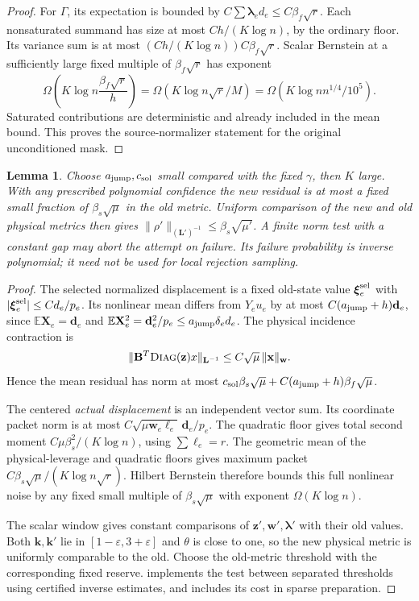 \documentclass[11pt]{article}
\newtheorem{lemma}[theorem]{Lemma}
\theoremstyle{remark}
\newcommand{\BB}{\mathbf B}
\newcommand{\LL}{\mathbf L}
\newcommand{\llambda}{\boldsymbol{\lambda}}
\newcommand{\ww}{\mathbf w}
\newcommand{\zz}{\mathbf z}
\newcommand{\XX}{\mathbf X}
\newcommand{\kk}{\mathbf k}
\newcommand{\dd}{\mathbf d}
\newcommand{\xx}{\mathbf x}
\newcommand{\xxi}{\boldsymbol{\xi}}
\newcommand{\diag}{\textsc{Diag}}
\newcommand{\Ex}{\mathbb E}
\newcommand{\norm}[1]{\lVert#1\rVert}
\begin{document}
\begin{proof}
For $\Gamma$, its expectation is bounded by $C\sum\llambda_ed_e\le C\beta_f\sqrt
r$.
Each nonsaturated summand has size at most $Ch/(K\log n)$, by the ordinary floor.
Its variance sum is at most $(Ch/(K\log n))C\beta_f\sqrt r$.
Scalar Bernstein at a sufficiently large fixed multiple of $\beta_f\sqrt r$ has
exponent
\[
 \Omega\left(K\log n\frac{\beta_f\sqrt r}{h}\right)
 =\Omega(K\log n\sqrt r/M)=\Omega(K\log n n^{1/4}/10^5).
\]
Saturated contributions are deterministic and already included in the mean
bound.
This proves the source-normalizer statement for the original unconditioned mask.
\end{proof}

\begin{lemma}
\label{lem:ram-residual}
Choose $a_{\rm jump},c_{\rm sol}$ small compared with the fixed $\gamma$, then
$K$ large.
With any prescribed polynomial confidence the new residual is at most a fixed
small fraction of $\beta_s\sqrt\mu$ in the old metric.
Uniform comparison of the new and old physical metrics then gives
$\norm{\rho'}_{(\LL')^{-1}}\le\beta_s\sqrt{\mu'}$.
A finite norm test with a constant gap may abort the attempt on failure.
Its failure probability is inverse polynomial; it need not be used for local
rejection sampling.
\end{lemma} \begin{proof} The selected normalized displacement is a fixed
old-state value $\xxi_e^{\rm sel}$ with $|\xxi_e^{\rm sel}|\le Cd_e/p_e$.
Its nonlinear mean differs from $Y_eu_e$ by at most $C(a_{\rm jump}+h)\dd_e$,
since $\Ex \XX_e=\dd_e$ and $\Ex \XX_e^2=\dd_e^2/p_e\le a_{\rm jump}\delta_ed_e$.
The physical incidence contraction is
\[
 \norm{\BB^T\diag(\zz)x}_{\LL^{-1}}
                         \le C\sqrt\mu\,\norm{\xx}_{\ww}.
\]
Hence the mean residual has norm at most $c_{\rm sol}\beta_s\sqrt\mu+ C(a_{\rm
jump}+h)\beta_f\sqrt\mu$.

The centered \emph{actual displacement} is an independent vector sum.
Its coordinate packet norm is at most $C\sqrt{\mu \ww_e\ell_e}\,\dd_e/p_e$.
The quadratic floor gives total second moment $C\mu\beta_s^2/(K\log n)$, using
$\sum\ell_e=r$.
The geometric mean of the physical-leverage and quadratic floors gives maximum
packet $C\beta_s\sqrt\mu/(K\log n\sqrt r)$.
Hilbert Bernstein therefore bounds this full nonlinear noise by any fixed small
multiple of $\beta_s\sqrt\mu$ with exponent $\Omega(K\log n)$.

The scalar window gives constant comparisons of $\zz',\ww',\llambda'$ with their old
values.
Both $\kk,\kk'$ lie in $[1-\varepsilon,3+\varepsilon]$ and $\theta$ is close to one,
so the new physical metric is uniformly comparable to the old.
Choose the old-metric threshold with the corresponding fixed reserve.
 implements the test between separated
thresholds using certified inverse estimates, and includes its cost in sparse
preparation.
\end{proof}
\end{document}
